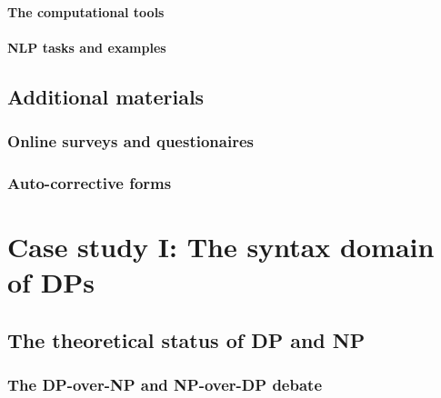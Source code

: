 \documentclass[
  a4paper,
  twoside,
  12pt,
  chapterprefix=false,
  bibliography=totocnumbered,
  listof=flat]{scrbook}
\begin{document}
\hypertarget{the-computational-tools}{%
\subsubsection{The computational tools}\label{the-computational-tools}}

\hypertarget{nlp-tasks-and-examples}{%
\subsubsection{NLP tasks and examples}\label{nlp-tasks-and-examples}}

\hypertarget{additional-materials}{%
\section{Additional materials}\label{additional-materials}}

\hypertarget{online-surveys-and-questionaires}{%
\subsection{Online surveys and questionaires}\label{online-surveys-and-questionaires}}

\hypertarget{auto-corrective-forms}{%
\subsection{Auto-corrective forms}\label{auto-corrective-forms}}

\hypertarget{case-study-i-the-syntax-domain-of-dps}{%
\chapter{Case study I: The syntax domain of DPs}\label{case-study-i-the-syntax-domain-of-dps}}

\hypertarget{the-theoretical-status-of-dp-and-np}{%
\section{The theoretical status of DP and NP}\label{the-theoretical-status-of-dp-and-np}}

\hypertarget{the-dp-over-np-and-np-over-dp-debate}{%
\subsection{The DP-over-NP and NP-over-DP debate}\label{the-dp-over-np-and-np-over-dp-debate}}
\end{document}
